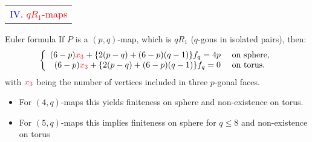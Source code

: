 \documentclass[%
pdf,
colorBG,
slideColor,
]{prosper}
\begin{document}
\begin{slide}{}
\begin{center}
{\Huge 
\begin{tabular*}{7cm}{c}
\\[-0.5cm]
\textcolor{blue}{IV. }\textcolor{red}{$qR_1$-maps}
\end{tabular*}
}
\end{center}
\end{slide}



\begin{slide}{Euler formula}
If $P$ is a $(p,q)$-map, which is $qR_1$ ($q$-gons in isolated pairs), then:
\begin{equation*}
\left\lbrace\begin{array}{rl}
(6-p)\textcolor{red}{x_3}+\{2(p-q)+(6-p)(q-1) \}f_q=4p  &\mbox{~on~sphere},\\
(6-p)\textcolor{red}{x_3}+\{2(p-q)+(6-p)(q-1) \}f_q=0   &\mbox{~on~torus}.
\end{array}\right.
\end{equation*}
with $\textcolor{red}{x_3}$ being the number of vertices included in three $p$-gonal faces.

\begin{itemize}
\item For $(4,q)$-maps this yields finiteness on sphere and non-existence
on torus. 
\item For $(5,q)$-maps this implies finiteness on sphere for $q\leq 8$ and non-existence on torus
\end{itemize}

\end{slide}
\end{document}
